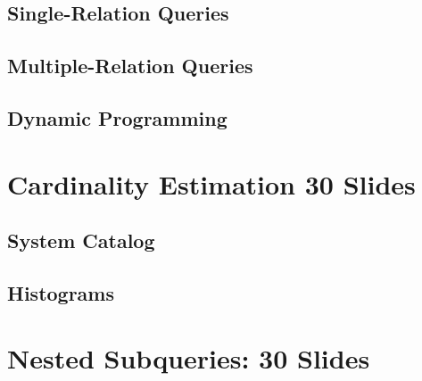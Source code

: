\subsection{Single-Relation Queries}
\begin{itemize}
\end{itemize}

\subsection{Multiple-Relation Queries}
\subsection{Dynamic Programming}

\section{Cardinality Estimation 30 Slides}
\subsection{System Catalog}
\subsection{Histograms}

\section{Nested Subqueries: 30 Slides}
